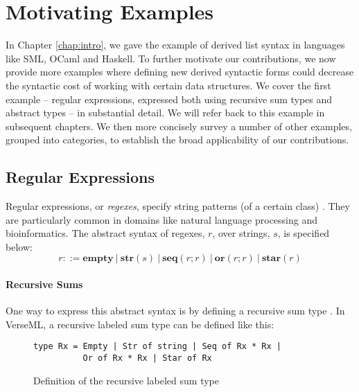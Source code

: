 
\section{Motivating Examples}\label{sec:motivating-examples}
In Chapter \ref{chap:intro}, we gave the example of derived list syntax in languages like SML, OCaml and Haskell. To further motivate our contributions, we now provide more examples where defining new derived syntactic forms could  decrease the syntactic cost of working with certain data structures. We cover the first example -- regular expressions, expressed both using recursive sum types and abstract types -- in substantial detail. We will refer back to this example in subsequent chapters. We then more concisely survey a number of other examples, grouped into  categories, to establish the broad applicability of our contributions. %

\subsection{Regular Expressions}\label{sec:syntax-examples-regexps}
Regular expressions, or \emph{regexes}, specify string patterns (of a certain class) \cite{Thompson:1968:PTR:363347.363387}. They are particularly common in domains like natural language processing and bioinformatics. The abstract syntax of {regexes}, $r$, over strings, $s$, is specified below:\[r ::= \textbf{empty} ~|~ \textbf{str}(s) ~|~ \textbf{seq}(r; r) ~|~ \textbf{or}(r; r) ~|~ \textbf{star}(r)\]

\paragraph{Recursive Sums}
One way to express this abstract syntax is by defining a recursive sum type \cite{pfpl}. In VerseML, a recursive labeled sum type can be defined like this:

\begin{figure}[ht]
\begin{lstlisting}[numbers=none]
type Rx = Empty | Str of string | Seq of Rx * Rx | 
          Or of Rx * Rx | Star of Rx
\end{lstlisting}
\caption{Definition of the recursive labeled sum type }
\label{fig:datatype-rx}
\end{figure}

